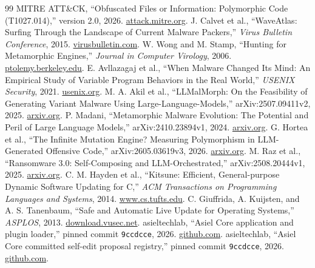 \documentclass[11pt,letterpaper]{article}
\begin{document}
\begingroup\small\raggedright
\begin{thebibliography}{99}
 MITRE ATT\&CK, ``Obfuscated Files or Information: Polymorphic Code (T1027.014),'' version 2.0, 2026. \href{https://attack.mitre.org/techniques/T1027/014/}{attack.mitre.org}.
 J. Calvet et al., ``WaveAtlas: Surfing Through the Landscape of Current Malware Packers,'' \emph{Virus Bulletin Conference}, 2015. \href{https://virusbulletin.com/uploads/pdf/conference/vb2015/Calvet-etal-VB2015.pdf}{virusbulletin.com}.
 W. Wong and M. Stamp, ``Hunting for Metamorphic Engines,'' \emph{Journal in Computer Virology}, 2006. \href{https://ptolemy.berkeley.edu/projects/truststc/pubs/237/hunting.pdf}{ptolemy.berkeley.edu}.
 E. Avllazagaj et al., ``When Malware Changed Its Mind: An Empirical Study of Variable Program Behaviors in the Real World,'' \emph{USENIX Security}, 2021. \href{https://www.usenix.org/conference/usenixsecurity21/presentation/avllazagaj}{usenix.org}.
 M. A. Akil et al., ``LLMalMorph: On the Feasibility of Generating Variant Malware Using Large-Language-Models,'' arXiv:2507.09411v2, 2025. \href{https://arxiv.org/html/2507.09411v2}{arxiv.org}.
 P. Madani, ``Metamorphic Malware Evolution: The Potential and Peril of Large Language Models,'' arXiv:2410.23894v1, 2024. \href{https://arxiv.org/html/2410.23894}{arxiv.org}.
 G. Hortea et al., ``The Infinite Mutation Engine? Measuring Polymorphism in LLM-Generated Offensive Code,'' arXiv:2605.03619v3, 2026. \href{https://arxiv.org/html/2605.03619v3}{arxiv.org}.
 M. Raz et al., ``Ransomware 3.0: Self-Composing and LLM-Orchestrated,'' arXiv:2508.20444v1, 2025. \href{https://arxiv.org/html/2508.20444v1}{arxiv.org}.
 C. M. Hayden et al., ``Kitsune: Efficient, General-purpose Dynamic Software Updating for C,'' \emph{ACM Transactions on Programming Languages and Systems}, 2014. \href{https://www.cs.tufts.edu/~jfoster/papers/toplas-kitsune.pdf}{www.cs.tufts.edu}.
 C. Giuffrida, A. Kuijsten, and A. S. Tanenbaum, ``Safe and Automatic Live Update for Operating Systems,'' \emph{ASPLOS}, 2013. \href{https://download.vusec.net/papers/asplos-2013.pdf}{download.vusec.net}.
 asieltechlab, ``Asiel Core application and plugin loader,'' pinned commit \texttt{9ccdcce}, 2026. \href{https://github.com/asieltechlab/asiel-core/tree/9ccdcce55211b1cd9a11eb1ac2e8414443df2b96}{github.com}.
 asieltechlab, ``Asiel Core committed self-edit proposal registry,'' pinned commit \texttt{9ccdcce}, 2026. \href{https://github.com/asieltechlab/asiel-core/blob/9ccdcce55211b1cd9a11eb1ac2e8414443df2b96/asiel_core/asiel_core/self_edit/proposals.json}{github.com}.

\end{thebibliography}
\end{document}
